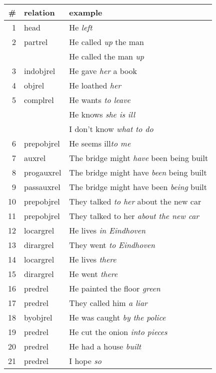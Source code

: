 \begin{tabular}{|r|l|l|} \hline
\#&relation&example\\ \hline
1&head&He {\em left}\\ \hline
2&partrel&He called {\em up} the man\\ \hline
&&He called the man {\em up}\\ \hline
3&indobjrel&He gave {\em her} a book\\ \hline
4&objrel&He loathed {\em her}\\ \hline
5&complrel&He wants {\em to leave}\\ \hline
&&He knows {\em she is ill}\\ \hline
&&I don't know {\em what to do}\\ \hline
6&prepobjrel&He seems ill{\em to me}\\ \hline
7&auxrel&The bridge might {\em have} been being built\\ \hline
8&progauxrel&The bridge might have {\em been} being built\\ \hline
9&passauxrel&The bridge might have been {\em being} built\\ \hline
10&prepobjrel&They talked {\em to her} about the new car\\ \hline
11&prepobjrel&They talked to her {\em about the new car}\\ \hline
12&locargrel&He lives {\em in Eindhoven}\\ \hline
13&dirargrel&They went {\em to Eindhoven}\\ \hline
14&locargrel&He lives {\em there}\\ \hline
15&dirargrel&He went {\em there}\\ \hline
16&predrel&He painted the floor {\em green}\\ \hline
17&predrel&They called him {\em a liar}\\ \hline
18&byobjrel&He was caught {\em by the police}\\ \hline
19&predrel&He cut the onion {\em into pieces}\\ \hline
20&predrel&He had a house {\em built}\\ \hline
21&predrel&I hope {\em so}\\ \hline
\end{tabular}
